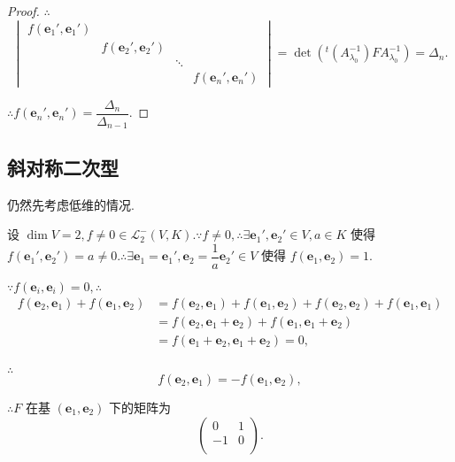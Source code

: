 \documentclass[color=black,device=normal,lang=cn,mode=geye]{elegantnote}
\begin{document}
\begin{proof}
    $\therefore$
    \[\begin{vmatrix}
        f(\boldsymbol{e}_1',\boldsymbol{e}_1') \\
        & f(\boldsymbol{e}_2',\boldsymbol{e}_2') \\
        && \ddots \\
        &&& f(\boldsymbol{e}_n',\boldsymbol{e}_n')
    \end{vmatrix}=\det({}^t(A_{\lambda_0}^{-1})FA_{\lambda_0}^{-1})=\Delta_n.\]

    $\therefore f(\boldsymbol{e}_n',\boldsymbol{e}_n')=\dfrac{\Delta_n}{\Delta_{n-1}}$.
\end{proof}
\subsection{斜对称二次型}
仍然先考虑低维的情况.

设 $\dim V=2,f\neq0\in\mathcal{L}_2^-(V,K).\because f\neq0,\therefore\exists\boldsymbol{e}_1',\boldsymbol{e}_2'\in V,a\in K$ 使得 $f(\boldsymbol{e}_1',\boldsymbol{e}_2')=a\neq0.\therefore\exists\boldsymbol{e}_1=\boldsymbol{e}_1',\boldsymbol{e}_2=\dfrac{1}{a}\boldsymbol{e}_2'\in V$ 使得 $f(\boldsymbol{e}_1,\boldsymbol{e}_2)=1$.

$\because f(\boldsymbol{e}_i,\boldsymbol{e}_i)=0,\therefore$
\begin{align*}
    f(\boldsymbol{e}_2,\boldsymbol{e}_1)+f(\boldsymbol{e}_1,\boldsymbol{e}_2) & =f(\boldsymbol{e}_2,\boldsymbol{e}_1)+f(\boldsymbol{e}_1,\boldsymbol{e}_2)+f(\boldsymbol{e}_2,\boldsymbol{e}_2)+f(\boldsymbol{e}_1,\boldsymbol{e}_1) \\
    & =f(\boldsymbol{e}_2,\boldsymbol{e}_1+\boldsymbol{e}_2)+f(\boldsymbol{e}_1,\boldsymbol{e}_1+\boldsymbol{e}_2) \\
    & =f(\boldsymbol{e}_1+\boldsymbol{e}_2,\boldsymbol{e}_1+\boldsymbol{e}_2)=0, \\
\end{align*}

$\therefore$
\[f(\boldsymbol{e}_2,\boldsymbol{e}_1)=-f(\boldsymbol{e}_1,\boldsymbol{e}_2),\]

$\therefore F$ 在基 $(\boldsymbol{e}_1,\boldsymbol{e}_2)$ 下的矩阵为
\[\begin{pmatrix}
    0 & 1 \\
    -1 & 0 \\
\end{pmatrix}.\]
\end{document}
